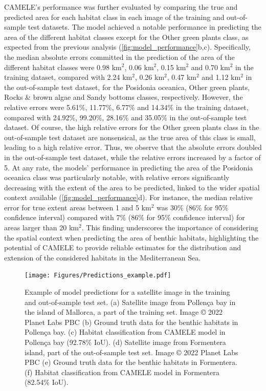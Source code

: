 CAMELE's performance was further evaluated by comparing the true and predicted
area for each habitat class in each image of the training and out-of-sample
test datasets. The model achieved a notable performance in predicting the area
of the different habitat classes except for the Other green plants class,
as expected from the previous analysis (\cref{fig:model_performance}b,c).
Specifically, the median absolute errors committed in the prediction of the
area of the different habitat classes were 0.98 km$^2$, 0.06 km$^2$, 0.15
km$^2$ and 0.70 km$^2$ in the training dataset, compared with 2.24 km$^2$, 0.26
km$^2$, 0.47 km$^2$ and 1.12 km$^2$ in the out-of-sample test dataset, for the
Posidonia oceanica, Other green plants, Rocks \& brown algae
and Sandy bottoms classes, respectively. However, the relative errors
were 5.61\%, 11.77\%, 6.77\% and 14.34\% in the training dataset, compared with
24.92\%, 99.20\%, 28.16\% and 35.05\% in the out-of-sample test dataset. Of
course, the high relative errors for the Other green plants
class in the out-of-sample test dataset are nonsensical, as the true area of
this class is small, leading to a high relative error. Thus, we observe
that the absolute errors doubled in the out-of-sample test dataset, while the
relative errors increased by a factor of 5. At any rate, the models'
performance in predicting the area of the Posidonia oceanica class was
particularly notable, with relative errors significantly decreasing with
the extent of the area to be predicted, linked to the wider spatial context
available (\cref{fig:model_performance}d). For instance, the median relative
error for true extent areas between 1 and 5 km$^2$ was 30\% (86\% for 95\%
confidence interval) compared with 7\% (86\% for 95\% confidence interval) for
areas larger than 20 km$^2$.  This finding underscores the importance of
considering the spatial context when predicting the area of benthic habitats,
highlighting the potential of CAMELE to provide reliable estimates for the
distribution and extension of the considered habitats in the Mediterranean Sea.

\begin{figure}[H]
    \centering
    \texttt{[image: Figures/Predictions\_example.pdf]}
    \caption{Example of model predictions for a satellite image in the training
        and out-of-sample test set. (a) Satellite image from Pollença bay in
        the island of Mallorca, a part of the training set. Image © 2022 Planet
        Labs PBC (b) Ground truth
        data for the benthic habitats in Pollença bay. (c) Habitat
        classification from CAMELE model in Pollença bay (92.78\% IoU). (d)
        Satellite image from Formentera island, part of the out-of-sample test
        set. Image © 2022 Planet
        Labs PBC (e) Ground truth data for the benthic habitats in Formentera.
        (f)
        Habitat classification from CAMELE model in Formentera (82.54\% IoU).}
    \label{fig:example_prediction}
\end{figure}

